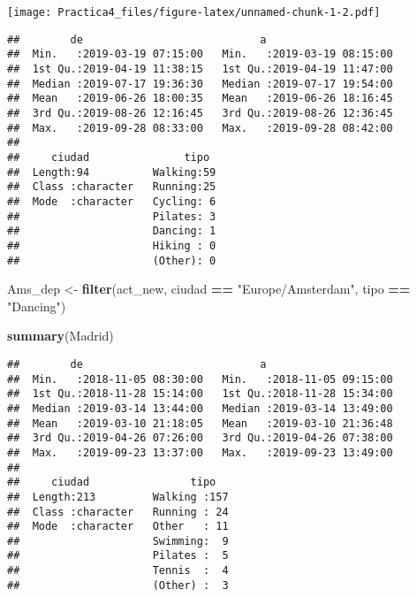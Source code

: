 \documentclass[]{article}
\newenvironment{Shaded}{\begin{snugshade}}{\end{snugshade}}
\newcommand{\CommentTok}[1]{\textcolor[rgb]{0.56,0.35,0.01}{\textit{#1}}}
\newcommand{\DataTypeTok}[1]{\textcolor[rgb]{0.13,0.29,0.53}{#1}}
\newcommand{\KeywordTok}[1]{\textcolor[rgb]{0.13,0.29,0.53}{\textbf{#1}}}
\newcommand{\NormalTok}[1]{#1}
\newcommand{\OperatorTok}[1]{\textcolor[rgb]{0.81,0.36,0.00}{\textbf{#1}}}
\newcommand{\StringTok}[1]{\textcolor[rgb]{0.31,0.60,0.02}{#1}}
\begin{document}
\texttt{[image: Practica4\_files/figure-latex/unnamed-chunk-1-2.pdf]}

\begin{Shaded}
\end{Shaded}

\begin{verbatim}
##        de                            a                      
##  Min.   :2019-03-19 07:15:00   Min.   :2019-03-19 08:15:00  
##  1st Qu.:2019-04-19 11:38:15   1st Qu.:2019-04-19 11:47:00  
##  Median :2019-07-17 19:36:30   Median :2019-07-17 19:54:00  
##  Mean   :2019-06-26 18:00:35   Mean   :2019-06-26 18:16:45  
##  3rd Qu.:2019-08-26 12:16:45   3rd Qu.:2019-08-26 12:36:45  
##  Max.   :2019-09-28 08:33:00   Max.   :2019-09-28 08:42:00  
##                                                             
##     ciudad               tipo   
##  Length:94          Walking:59  
##  Class :character   Running:25  
##  Mode  :character   Cycling: 6  
##                     Pilates: 3  
##                     Dancing: 1  
##                     Hiking : 0  
##                     (Other): 0
\end{verbatim}

\begin{Shaded}
\begin{Highlighting}[]
\NormalTok{Ams_dep <-}\StringTok{ }\KeywordTok{filter}\NormalTok{(act_new, ciudad }\OperatorTok{==}\StringTok{ "Europe/Amsterdam"}\NormalTok{, tipo }\OperatorTok{==}\StringTok{ "Dancing"}\NormalTok{)}


\KeywordTok{summary}\NormalTok{(Madrid)}
\end{Highlighting}
\end{Shaded}

\begin{verbatim}
##        de                            a                      
##  Min.   :2018-11-05 08:30:00   Min.   :2018-11-05 09:15:00  
##  1st Qu.:2018-11-28 15:14:00   1st Qu.:2018-11-28 15:34:00  
##  Median :2019-03-14 13:44:00   Median :2019-03-14 13:49:00  
##  Mean   :2019-03-10 21:18:05   Mean   :2019-03-10 21:36:48  
##  3rd Qu.:2019-04-26 07:26:00   3rd Qu.:2019-04-26 07:38:00  
##  Max.   :2019-09-23 13:37:00   Max.   :2019-09-23 13:49:00  
##                                                             
##     ciudad                tipo    
##  Length:213         Walking :157  
##  Class :character   Running : 24  
##  Mode  :character   Other   : 11  
##                     Swimming:  9  
##                     Pilates :  5  
##                     Tennis  :  4  
##                     (Other) :  3
\end{verbatim}
\end{document}
